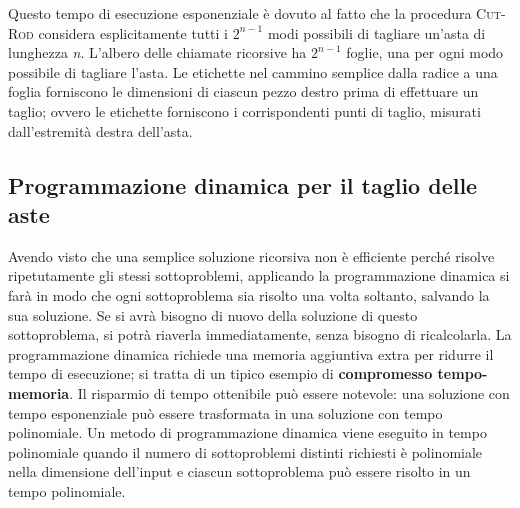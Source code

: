 \documentclass[10pt, a4paper]{report}
\begin{document}
Questo tempo di esecuzione esponenziale è dovuto al fatto che la procedura \textsc{Cut-Rod} considera esplicitamente tutti i $2^{n-1}$ modi possibili di tagliare un'asta di lunghezza \textit{n}. L'albero delle chiamate ricorsive ha $2^{n-1}$ foglie, una per ogni modo possibile di tagliare l'asta. Le etichette nel cammino semplice dalla radice a una foglia forniscono le dimensioni di ciascun pezzo destro prima di effettuare un taglio; ovvero le etichette forniscono i corrispondenti punti di taglio, misurati dall'estremità destra dell'asta.
\subsection{Programmazione dinamica per il taglio delle aste}
Avendo visto che una semplice soluzione ricorsiva non è efficiente perché risolve ripetutamente gli stessi sottoproblemi, applicando la programmazione dinamica si farà in modo che ogni sottoproblema sia risolto una volta soltanto, salvando la sua soluzione. Se si avrà bisogno di nuovo della soluzione di questo sottoproblema, si potrà riaverla immediatamente, senza bisogno di ricalcolarla. La programmazione dinamica richiede una memoria aggiuntiva extra per ridurre il tempo di esecuzione; si tratta di un tipico esempio di \textbf{compromesso tempo-memoria}. Il risparmio di tempo ottenibile può essere notevole: una soluzione con tempo esponenziale può essere trasformata in una soluzione con tempo polinomiale. Un metodo di programmazione dinamica viene eseguito in tempo polinomiale quando il numero di sottoproblemi distinti richiesti è polinomiale nella dimensione dell'input e ciascun sottoproblema può essere risolto in un tempo polinomiale.
\end{document}
